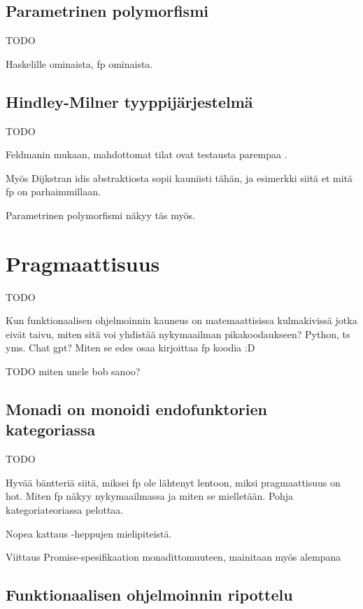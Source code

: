 \subsection{Parametrinen polymorfismi}

TODO

Haskelille ominaista, \gls{fp} ominaista.


\subsection{Hindley-Milner tyyppijärjestelmä}

TODO

Feldmanin mukaan, mahdottomat tilat ovat testausta parempaa \cite{impossiblebetter}.

Myös Dijkstran idis abstraktiosta sopii kauniisti tähän, ja esimerkki siitä et mitä \gls{fp} on parhaimmillaan.

Parametrinen polymorfismi näkyy täs myös.


\section{Pragmaattisuus}

TODO

Kun funktionaalisen ohjelmoinnin kauneus on matemaattisissa kulmakivissä jotka eivät taivu, miten sitä voi yhdistää nykymaailman pikakoodaukseen? Python, \gls{ts} yms. Chat gpt? Miten se edes osaa kirjoittaa fp koodia :D

TODO miten uncle bob sanoo? \cite{martin2017pragmaticfp}

\subsection{Monadi on monoidi endofunktorien kategoriassa}

TODO

Hyvää bäntteriä siitä, miksei fp ole lähtenyt lentoon, miksi pragmaattisuus on hot. Miten fp näkyy nykymaailmassa ja miten se mielletään. Pohja kategoriateoriassa pelottaa.

Nopea kattaus  -heppujen mielipiteistä.

Viittaus Promise-spesifikaation monadittomuuteen, mainitaan myös alempana

\subsection{Funktionaalisen ohjelmoinnin ripottelu}

